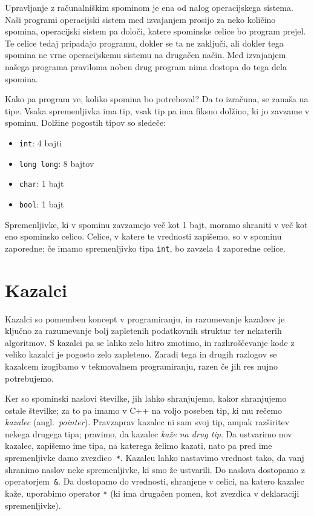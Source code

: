 Upravljanje z računalniškim spominom je ena od nalog operacijskega sistema.
Naši programi operacijski sistem med izvajanjem prosijo za neko količino spomina,
operacijski sistem pa določi, katere spominske celice bo program prejel.
Te celice tedaj pripadajo programu, dokler se ta ne zaključi, ali dokler tega
spomina ne vrne operacijskemu sistemu na drugačen način. Med izvajanjem
našega programa praviloma noben drug program nima dostopa do tega dela
spomina.

Kako pa program ve, koliko spomina bo potreboval? Da to izračuna, se zanaša
na tipe. Vsaka spremenljivka ima tip, vsak tip pa ima fiksno dolžino, ki jo
zavzame v spominu. Dolžine pogostih tipov so sledeče:
\begin{itemize}
  \item \verb+int+: 4 bajti
  \item \verb+long long+: 8 bajtov
  \item \verb+char+: 1 bajt
  \item \verb+bool+: 1 bajt
\end{itemize}
Spremenljivke, ki v spominu zavzamejo več kot 1 bajt, moramo shraniti v več
kot eno spominsko celico. Celice, v katere te vrednosti zapišemo, so v spominu
zaporedne; če imamo spremenljivko tipa \verb+int+, bo zavzela 4 zaporedne celice.

\section{Kazalci}

\begin{errors}
  Kazalci so pomemben koncept v programiranju, in razumevanje kazalcev je ključno
  za razumevanje bolj zapletenih podatkovnih struktur ter nekaterih algoritmov.
  S kazalci pa se lahko zelo hitro zmotimo, in razhroščevanje kode z veliko
  kazalci je pogosto zelo zapleteno. Zaradi tega in drugih razlogov
  se kazalcem izogibamo v tekmovalnem programiranju, razen če jih res nujno
  potrebujemo.
\end{errors}

Ker so spominski naslovi številke, jih lahko shranjujemo, kakor shranjujemo
ostale številke; za to pa imamo v C++ na voljo poseben tip, ki mu rečemo
\emph{kazalec} (angl.~\textit{pointer}).
Pravzaprav kazalec ni sam svoj tip, ampak razširitev nekega drugega tipa;
pravimo, da kazalec \emph{kaže na drug tip}.
Da ustvarimo nov kazalec, zapišemo ime tipa, na katerega želimo kazati,
nato pa pred ime spremenljivke damo zvezdico~\verb+*+.
Kazalcu lahko nastavimo vrednost tako, da vanj shranimo naslov neke
spremenljivke, ki smo že ustvarili. Do naslova dostopamo z operatorjem~\verb+&+.
Da dostopamo do vrednosti, shranjene v celici, na katero kazalec kaže,
uporabimo operator \verb+*+ (ki ima drugačen pomen, kot zvezdica v deklaraciji
spremenljivke).


